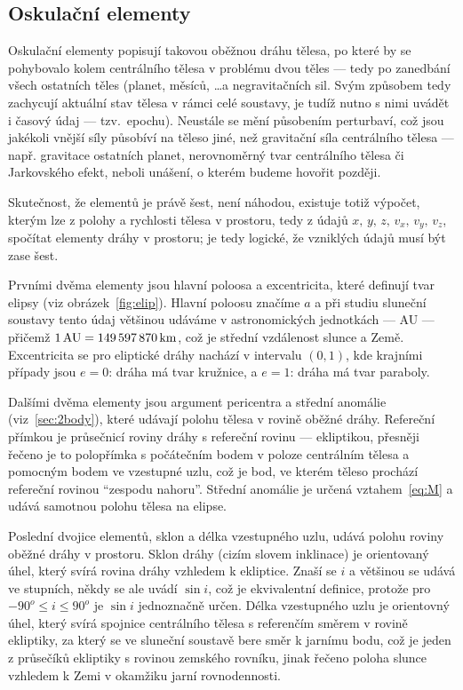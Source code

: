 \documentclass[A4paper, 12pt, oneside]{book}
\begin{document}
\subsection{Oskulační elementy}
Oskulační elementy popisují takovou oběžnou dráhu tělesa, po které by se pohybovalo kolem centrálního tělesa v problému dvou těles --- tedy po zanedbání všech ostatních těles (planet, měsíců, \ldots a negravitačních sil. Svým způsobem tedy zachycují aktuální stav tělesa v rámci celé soustavy, je tudíž nutno s nimi uvádět i časový údaj --- tzv.\ epochu). Neustále se mění působením perturbaví, což jsou jakékoli vnější síly působíví na těleso jiné, než gravitační síla centrálního tělesa --- např. gravitace ostatních planet, nerovnoměrný tvar centrálního tělesa či Jarkovského efekt, neboli unášení, o kterém budeme hovořit později.

Skutečnost, že elementů je právě šest, není náhodou, existuje totiž výpočet, kterým lze z polohy a rychlosti tělesa v prostoru, tedy z údajů $x,\, y,\, z,\, v_x,\, v_y,\, v_z$, spočítat elementy dráhy v prostoru; je tedy logické, že vzniklých údajů musí být zase šest.

Prvními dvěma elementy jsou hlavní poloosa a excentricita, které definují tvar elipsy (viz obrázek~\ref{fig:elip}). Hlavní poloosu značíme $a$ a při studiu sluneční soustavy tento údaj většinou udáváme v astronomických jednotkách --- AU --- přičemž $1\, {\rm AU} = 149\,597\,870\,{\rm km}$, což je střední vzdálenost slunce a Země. Excentricita se pro eliptické dráhy nachází v intervalu $(0,1)$, kde krajními případy jsou $e=0$: dráha má tvar kružnice, a $e=1$: dráha má tvar paraboly.

Dalšími dvěma elementy jsou argument pericentra a střední anomálie (viz~\ref{sec:2body}), které udávají polohu tělesa v rovině oběžné dráhy. Refereční přímkou je průsečnicí roviny dráhy s refereční rovinu --- ekliptikou, přesněji řečeno je to polopřímka s počátečním bodem v poloze centrálním tělesa a pomocným bodem ve vzestupné uzlu, což je bod, ve kterém těleso prochází refereční rovinou \enquote{zespodu nahoru}. Střední anomálie je určená vztahem~\ref{eq:M} a udává samotnou polohu tělesa na elipse.

Poslední dvojice elementů, sklon a délka vzestupného uzlu, udává polohu roviny oběžné dráhy v prostoru. Sklon dráhy (cizím slovem inklinace) je orientovaný úhel, který svírá rovina dráhy vzhledem k ekliptice. Znaší se $i$ a většinou se udává ve stupních, někdy se ale uvádí $\sin i$, což je ekvivalentní definice, protože pro $-90^o\leq i \leq 90^o$ je $\sin i$ jednoznačně určen. Délka vzestupného uzlu je orientovný úhel, který svírá spojnice centrálního tělesa s referenčím směrem v rovině ekliptiky, za který se ve sluneční soustavě bere směr k jarnímu bodu, což je jeden z průsečíků ekliptiky s rovinou zemského rovníku, jinak řečeno poloha slunce vzhledem k Zemi v okamžiku jarní rovnodennosti.
\end{document}
